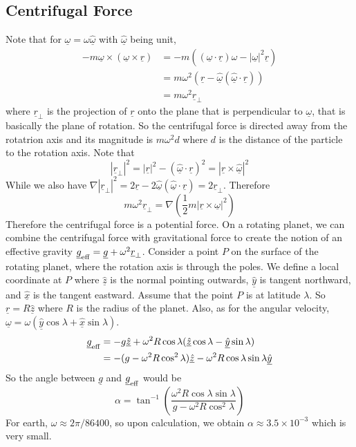 \subsection{Centrifugal Force}
Note that for $\underline{\omega}=\omega\underline{\hat{\omega}}$ with $\underline{\hat{\omega}}$ being unit,
\begin{align*}
    -m\underline{\omega}\times(\underline{\omega}\times\underline{r})&=-m((\underline{\omega}\cdot\underline{r})\omega-|\underline{\omega}|^2\underline{r})\\
    &=m\omega^2(\underline{r}-\underline{\hat{\omega}}(\underline{\hat{\omega}}\cdot\underline{r}))\\
    &=m\omega^2\underline{r}_\perp
\end{align*}
where $\underline{r}_\perp$ is the projection of $\underline{r}$ onto the plane that is perpendicular to $\underline{\omega}$, that is basically the plane of rotation.
So the centrifugal force is directed away from the rotatrion axis and its magnitude is $m\omega^2d$ where $d$ is the distance of the particle to the rotation axis.
Note that
$$|\underline{r}_\perp|^2=|\underline{r}|^2-(\underline{\hat{\omega}}\cdot\underline{r})^2=|\underline{r}\times\underline{\hat\omega}|^2$$
While we also have $\nabla{|\underline{r}_\perp|^2}=2\underline{r}-2\underline{\hat\omega}(\underline{\hat\omega}\cdot\underline{r})=2\underline{r}_\perp$.
Therefore
$$m\omega^2\underline{r}_\perp=\nabla\left( \frac{1}{2}m|\underline{r}\times\underline{\omega}|^2 \right)$$
Therefore the centrifugal force is a potential force.
On a rotating planet, we can combine the centrifugal force with gravitational force to create the notion of an effective gravity $\underline{g}_{\rm eff}=\underline{g}+\omega^2\underline{r}_\perp$.
Consider a point $P$ on the surface of the rotating planet, where the rotation axis is through the poles.
We define a local coordinate at $P$ where $\underline{\hat{z}}$ is the normal pointing outwards, $\underline{\hat{y}}$ is tangent northward, and $\underline{\hat{x}}$ is the tangent eastward.
Assume that the point $P$ is at latitude $\lambda$.
So $\underline{r}=R\underline{\hat{z}}$ where $R$ is the radius of the planet.
Also, as for the angular velocity, $\underline{\omega}=\omega(\underline{\hat{y}}\cos\lambda+\underline{\hat{x}}\sin\lambda)$.
\begin{align*}
    \underline{g}_{\rm eff}&=-g\underline{\hat{z}}+\omega^2R\cos\lambda(\underline{\hat{z}}\cos\lambda-\underline{\hat{y}}\sin\lambda)\\
    &=-(g-\omega^2R\cos^2\lambda)\underline{\hat{z}}-\omega^2R\cos\lambda\sin\lambda\underline{\hat{y}}
\end{align*}
So the angle between $\underline{g}$ and $\underline{g}_{\rm eff}$ would be
$$\alpha=\tan^{-1}\left( \frac{\omega^2R\cos\lambda\sin\lambda}{g-\omega^2R\cos^2\lambda} \right)$$
For earth, $\omega\approx 2\pi/86400$, so upon calculation, we obtain $\alpha\approx 3.5\times 10^{-3}$ which is very small.
